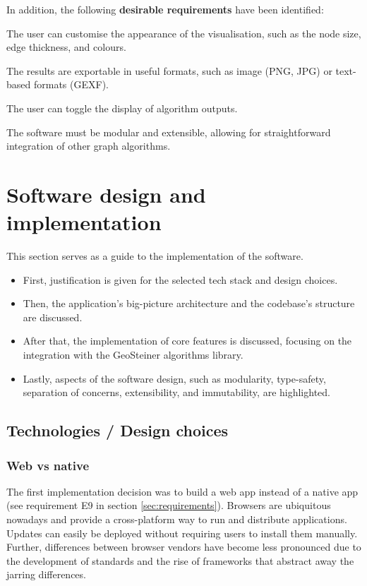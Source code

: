 \documentclass{l4proj}
\begin{document}
In addition, the following \textbf{desirable requirements} have been identified:
\begin{desirables}
    \item The user can customise the appearance of the visualisation, such as the node size, edge thickness, and colours.
    \item The results are exportable in useful formats, such as image (PNG, JPG) or text-based formats (GEXF).
    \item The user can toggle the display of algorithm outputs.
    \item The software must be modular and extensible, allowing for straightforward integration of other graph algorithms.
\end{desirables}

\chapter{Software design and implementation}
\label{sec:software_design_and_implementation}
This section serves as a guide to the implementation of the software.
\begin{itemize}
    \item First, justification is given for the selected tech stack and design choices.
    \item Then, the application's big-picture architecture and the codebase's structure are discussed.
    \item After that, the implementation of core features is discussed, focusing on the integration with the GeoSteiner algorithms library.
    \item Lastly, aspects of the software design, such as modularity, type-safety, separation of concerns, extensibility, and immutability, are highlighted.
\end{itemize}

\section{Technologies / Design choices}
\subsection{Web vs native}
The first implementation decision was to build a web app instead of a native app (see requirement E9 in section \ref{sec:requirements}). Browsers are ubiquitous nowadays and provide a cross-platform way to run and distribute applications. Updates can easily be deployed without requiring users to install them manually. Further, differences between browser vendors have become less pronounced due to the development of standards and the rise of frameworks that abstract away the jarring differences.
\end{document}
